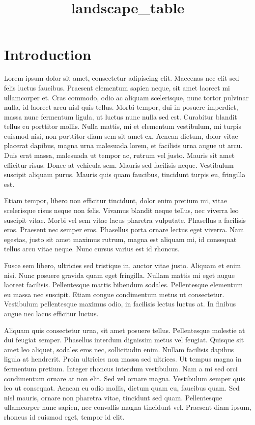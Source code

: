 \documentclass[]{article}
\title{landscape\_table}
\author{}
\date{}
\begin{document}
\maketitle

\section{Introduction}\label{introduction}

Lorem ipsum dolor sit amet, consectetur adipiscing elit. Maecenas nec
elit sed felis luctus faucibus. Praesent elementum sapien neque, sit
amet laoreet mi ullamcorper et. Cras commodo, odio ac aliquam
scelerisque, nunc tortor pulvinar nulla, id laoreet arcu nisl quis
tellus. Morbi tempor, dui in posuere imperdiet, massa nunc fermentum
ligula, ut luctus nunc nulla sed est. Curabitur blandit tellus eu
porttitor mollis. Nulla mattis, mi et elementum vestibulum, mi turpis
euismod nisi, non porttitor diam sem sit amet ex. Aenean dictum, dolor
vitae placerat dapibus, magna urna malesuada lorem, et facilisis urna
augue ut arcu. Duis erat massa, malesuada ut tempor ac, rutrum vel
justo. Mauris sit amet efficitur risus. Donec at vehicula sem. Mauris
sed facilisis neque. Vestibulum suscipit aliquam purus. Mauris quis quam
faucibus, tincidunt turpis eu, fringilla est.

Etiam tempor, libero non efficitur tincidunt, dolor enim pretium mi,
vitae scelerisque risus neque non felis. Vivamus blandit neque tellus,
nec viverra leo suscipit vitae. Morbi vel sem vitae lacus pharetra
vulputate. Phasellus a facilisis eros. Praesent nec semper eros.
Phasellus porta ornare lectus eget viverra. Nam egestas, justo sit amet
maximus rutrum, magna est aliquam mi, id consequat tellus arcu vitae
neque. Nunc cursus varius est id rhoncus.

Fusce sem libero, ultricies sed tristique in, auctor vitae justo.
Aliquam et enim nisi. Nunc posuere gravida quam eget fringilla. Nullam
mattis mi eget augue laoreet facilisis. Pellentesque mattis bibendum
sodales. Pellentesque elementum eu massa nec suscipit. Etiam congue
condimentum metus ut consectetur. Vestibulum pellentesque maximus odio,
in facilisis lectus luctus at. In finibus augue nec lacus efficitur
luctus.

Aliquam quis consectetur urna, sit amet posuere tellus. Pellentesque
molestie at dui feugiat semper. Phasellus interdum dignissim metus vel
feugiat. Quisque sit amet leo aliquet, sodales eros nec, sollicitudin
enim. Nullam facilisis dapibus ligula at hendrerit. Proin ultricies non
massa sed ultrices. Ut tempus magna in fermentum pretium. Integer
rhoncus interdum vestibulum. Nam a mi sed orci condimentum ornare at non
elit. Sed vel ornare magna. Vestibulum semper quis leo ut consequat.
Aenean eu odio mollis, dictum quam eu, faucibus quam. Sed nisl mauris,
ornare non pharetra vitae, tincidunt sed quam. Pellentesque ullamcorper
nunc sapien, nec convallis magna tincidunt vel. Praesent diam ipsum,
rhoncus id euismod eget, tempor id elit.
\end{document}
